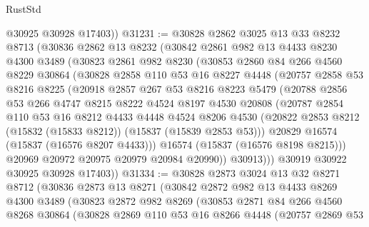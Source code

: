 \begin{lexlean}{RustStd}
\begin{coremodule}
        @30925
        @30928
        @17403))
@31231 := @30828
    @2862
    @3025
    @13
    @33
    @8232
    @8713
    (@30836
      @2862
      @13
      @8232
      (@30842
        @2861
        @982
        @13
        @4433
        @8230
        @4300
        @3489
        (@30823
          @2861
          @982
          @8230
          (@30853
            @2860
            @84
            @266
            @4560
            @8229
            @30864
            (@30828
              @2858
              @110
              @53
              @16
              @8227
              @4448
              (@20757
                @2858
                @53
                @8216
                @8225
                (@20918
                  @2857
                  @267
                  @53
                  @8216
                  @8223
                  @5479
                  (@20788
                    @2856
                    @53
                    @266
                    @4747
                    @8215
                    @8222
                    @4524
                    @8197
                    @4530
                    @20808
                    (@20787
                      @2854
                      @110
                      @53
                      @16
                      @8212
                      @4433
                      @4448
                      @4524
                      @8206
                      @4530
                      (@20822 @2853 @8212 (@15832 (@15833 @8212)) (@15837 (@15839 @2853 @53)))
                      @20829
                      @16574
                      (@15837 (@16576 @8207 @4433)))
                    @16574
                    (@15837 (@16576 @8198 @8215)))
                  @20969
                  @20972
                  @20975
                  @20979
                  @20984
                  @20990))
              @30913)))
        @30919
        @30922
        @30925
        @30928
        @17403))
@31334 := @30828
    @2873
    @3024
    @13
    @32
    @8271
    @8712
    (@30836
      @2873
      @13
      @8271
      (@30842
        @2872
        @982
        @13
        @4433
        @8269
        @4300
        @3489
        (@30823
          @2872
          @982
          @8269
          (@30853
            @2871
            @84
            @266
            @4560
            @8268
            @30864
            (@30828
              @2869
              @110
              @53
              @16
              @8266
              @4448
              (@20757
                @2869
                @53

\end{coremodule}
\end{lexlean}
